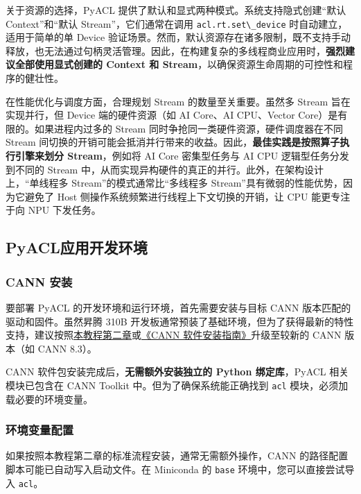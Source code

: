 关于资源的选择，PyACL 提供了默认和显式两种模式。系统支持隐式创建``默认
Context''和``默认 Stream''，它们通常在调用
\passthrough{\lstinline!acl.rt.set\_device!} 时自动建立，适用于简单的单
Device
验证场景。然而，默认资源存在诸多限制，既不支持手动释放，也无法通过句柄灵活管理。因此，在构建复杂的多线程商业应用时，\textbf{强烈建议全部使用显式创建的
Context 和 Stream}，以确保资源生命周期的可控性和程序的健壮性。

在性能优化与调度方面，合理规划 Stream 的数量至关重要。虽然多 Stream
旨在实现并行，但 Device 端的硬件资源（如 AI Core、AI CPU、Vector
Core）是有限的。如果进程内过多的 Stream
同时争抢同一类硬件资源，硬件调度器在不同 Stream
间切换的开销可能会抵消并行带来的收益。因此，\textbf{最佳实践是按照算子执行引擎来划分
Stream}，例如将 AI Core 密集型任务与 AI CPU 逻辑型任务分发到不同的
Stream 中，从而实现异构硬件的真正的并行。此外，在架构设计上，``单线程多
Stream''的模式通常比``多线程多 Stream''具有微弱的性能优势，因为它避免了
Host 侧操作系统频繁进行线程上下文切换的开销，让 CPU 能更专注于向 NPU
下发任务。

\subsection{PyACL应用开发环境}\label{src-book-chapter4-h4}

\subsubsection{CANN 安装}\label{src-book-chapter4-h5}

要部署 PyACL 的开发环境和运行环境，首先需要安装与目标 CANN
版本匹配的驱动和固件。虽然昇腾 310B
开发板通常预装了基础环境，但为了获得最新的特性支持，建议按照\href{https://zhouxzh.github.io/Ascend310/book/chapter2.html}{本教程第二章}或\href{https://www.hiascend.com/document/detail/zh/CANNCommunityEdition/83RC1/index/index.html}{《CANN
软件安装指南》}升级至较新的 CANN 版本（如 CANN 8.3）。

CANN 软件包安装完成后，\textbf{无需额外安装独立的 Python 绑定库}，PyACL
相关模块已包含在 CANN Toolkit 中。但为了确保系统能正确找到
\passthrough{\lstinline!acl!} 模块，必须加载必要的环境变量。

\subsubsection{环境变量配置}\label{src-book-chapter4-h6}

如果按照本教程第二章的标准流程安装，通常无需额外操作，CANN
的路径配置脚本可能已自动写入启动文件。在 Miniconda 的
\passthrough{\lstinline!base!} 环境中，您可以直接尝试导入
\passthrough{\lstinline!acl!}。

